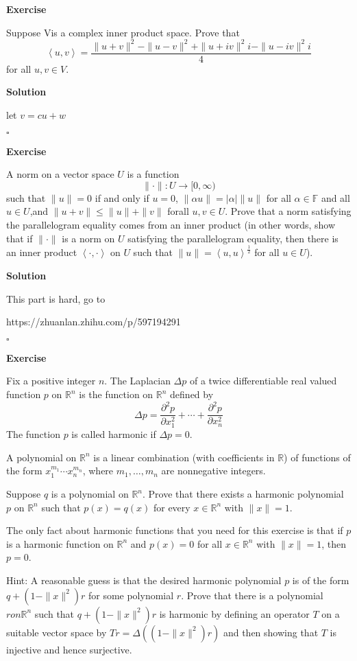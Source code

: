 \documentclass{article}
\newenvironment{exercise}{%
{\textbf{Exercise\\}
    }
}{
}
\newenvironment{solution}{%
{
    \textbf{Solution\\}
    }
}{
  \hfill $\square$ 
  \par\bigskip 
}
\newcommand{\RR}{\mathbb{R}}
\newcommand{\FF}{\mathbb{F}}
\begin{document}
\begin{CJK}{UTF8}{gkai}
\begin{exercise}
    Suppose Vis a complex inner product space. Prove that
    \[\left<u, v\right> = \dfrac{\|u+v\|^2 -\|u-v\|^2 +\|u+iv\|^2i -\|u-iv\|^2i}{4}\]
    for all $u,v \in V$.
\end{exercise}

\begin{solution}
    let $v = cu + w$
\end{solution}

\begin{exercise}
    A norm on a vector space $U$ is a function
    \[\|\cdot\|: U \rightarrow [0,\infty)\]
    such that $\|u\| = 0$ if and only if $u = 0$, $\|\alpha u\| = |\alpha |\|u\|$ for all $\alpha \in \FF$ and all $u \in U$,and $\|u+v\| \leq \|u\|+\|v\|$ forall $u,v \in U$. Prove that a norm satisfying the parallelogram equality comes from an inner product (in other words, show that if $\|\cdot\|$ is a norm on $U$ satisfying the parallelogram equality, then there is an inner product $\left<\cdot,\cdot\right>$ on $U$ such that $\|u\| = \left<u,u\right>^\frac{1}{2}$ for all $u \in U$).
\end{exercise}

\begin{solution}
    This part is hard, go to 
    
    https://zhuanlan.zhihu.com/p/597194291
\end{solution}

\begin{exercise}
    Fix a positive integer $n$. The Laplacian $\Delta p$ of a twice differentiable real valued function $p$ on $\RR^n$ is the function on $\RR^n$ defined by
    \[\Delta p = \dfrac{\partial^2 p}{\partial x_1^2} + \cdots + \dfrac{\partial^2 p}{\partial x_n^2}\]
    The function $p$ is called harmonic if $\Delta p = 0$.

    A polynomial on $\RR^n$ is a linear combination (with coefficients in $\RR$) of functions of the form $x_1^{m_1}\cdots x_n^{m_n}$, where $m_1,\ldots,m_n$ are nonnegative integers.

    Suppose $q$ is a polynomial on $\RR^n$. Prove that there exists a harmonic polynomial $p$ on $\RR^n$ such that $p(x) = q(x)$ for every $x \in \RR^n$ with $\|x\| = 1$.

    The only fact about harmonic functions that you need for this exercise is that if $p$ is a harmonic function on $\RR^n$ and $p(x) = 0$ for all $x \in \RR^n$ with $\|x\| = 1$, then $p = 0$.

    Hint: A reasonable guess is that the desired harmonic polynomial $p$ is of the form $q+(1-\|x\|^2)r$ for some polynomial $r$. Prove that there is a polynomial $r on \RR^n$ such that $q +(1-\|x\|^2)r$ is harmonic by defining an operator $T$ on a suitable vector space by $Tr = \Delta ((1-\|x\|^2)r)$ and then showing that $T$ is injective and hence surjective.
\end{exercise}


\end{CJK}
\end{document}
